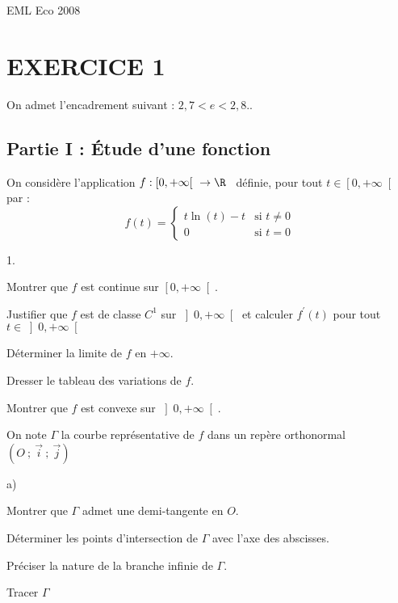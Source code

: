 \documentclass[11pt]{article}%
\begin{document}
\begin{center}
{\huge EML Eco 2008 }
\end{center}

\section*{EXERCICE 1}

On admet l'encadrement suivant :\hspace{5mm} $2,7<e<2,8$..

\subsection*{Partie I : Étude d'une fonction}

On considère l'application $f :\left[ 0, + \infty \right[ \ \rightarrow

\R$ \ définie, pour tout $t\in \left[ 0, + \infty \right[ $ par :
\[
f\left( t\right) = \left\{ 
\begin{array}{cc}
t\ln \left( t\right) -t & \text{si }t\neq 0 \\
0 & \text{si }t = 0
\end{array}
\right. 
\]

\begin{noliste}{1.}
 \setlength{\itemsep}{4mm}
\item Montrer que $f$ est continue sur $\left[ 0, + \infty \right[ $.

\item Justifier que $f$ est de classe $C^{1}$ sur $\left] 0, + \infty
\right[ $
et calculer $f^{\prime }\left( t\right) $ pour tout $t\in \left] 0, +
\infty \right[ $

\item Déterminer la limite de $f$ en $ + \infty $.

\item Dresser le tableau des variations de $f$.

\item Montrer que $f$ est convexe sur $\left] 0, + \infty \right[ $.

\item On note $\Gamma $ la courbe représentative de $f$ dans un repère
orthonormal $\left( O\ ;\ \vec{i}\ ;\ \vec{j}\right) $

\begin{noliste}{a)}
 \setlength{\itemsep}{2mm}
\item Montrer que $\Gamma $ admet une demi-tangente en $O$.

\item Déterminer les points d'intersection de $\Gamma $ avec l'axe des
abscisses.

\item Préciser la nature de la branche infinie de $\Gamma $.

\item Tracer $\Gamma $
\end{noliste}
\end{noliste}
\end{document}
